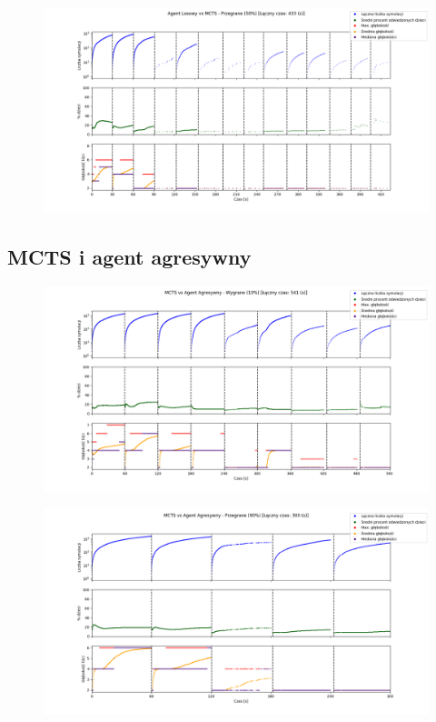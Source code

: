     \begin{figure}[H]
        \center
        \includegraphics[width=\textwidth]{imgs/plots/RA_MCTS_LOST.png}
    \end{figure}


  \pagebreak
  \subsection{MCTS i agent agresywny}

    \begin{figure}[H]
        \center
        \includegraphics[width=\textwidth]{imgs/plots/MCTS_AA_WIN.png}
    \end{figure}

    \begin{figure}[H]
        \center
        \includegraphics[width=\textwidth]{imgs/plots/MCTS_AA_LOST.png}
    \end{figure}

